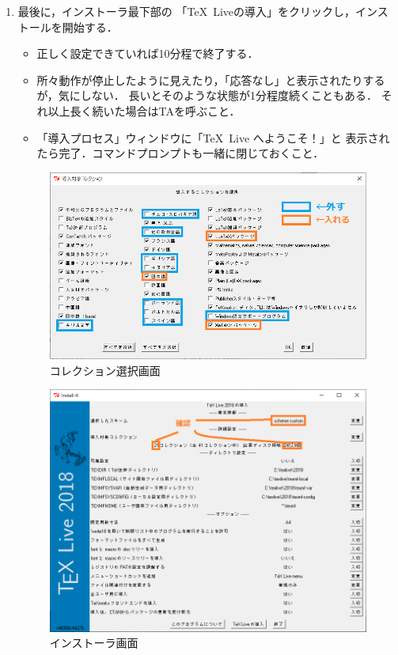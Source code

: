 \documentclass{ltjsarticle}
\begin{document}
\begin{enumerate}
\item 最後に，インストーラ最下部の
  「\TeX\ Liveの導入」をクリックし，インストールを開始する．
  \begin{itemize}
  \item 正しく設定できていれば10分程で終了する．
  \item 所々動作が停止したように見えたり，「応答なし」と表示されたりするが，気にしない．
    長いとそのような状態が1分程度続くこともある．
    それ以上長く続いた場合はTAを呼ぶこと．
  \item 「導入プロセス」ウィンドウに「\TeX\ Live へようこそ！」と
    表示されたら完了．コマンドプロンプトも一緒に閉じておくこと．
  \end{itemize}

  \clearpage
  \begin{figure}[t]
    \centering
    \includegraphics[scale=.7]{tl18col.png}
    \caption{コレクション選択画面}\label{col}
  \end{figure}

  \begin{figure}[b]
    \centering
    \includegraphics[scale=.5]{tl18top.png}
    \caption{インストーラ画面}\label{top}
  \end{figure}
\end{enumerate}
\end{document}
